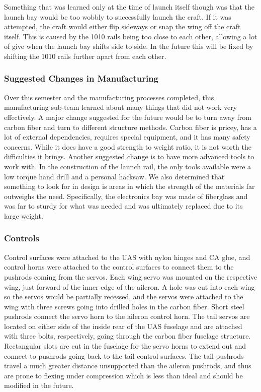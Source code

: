 \documentclass{article}
\begin{document}
Something that was learned only at the time of launch itself though was that the launch bay would be too wobbly to successfully launch the craft. If it was attempted, the craft would either flip sideways or snap the wing off the craft itself. This is caused by the 1010 rails being too close to each other, allowing a lot of give when the launch bay shifts side to side. In the future this will be fixed by shifting the 1010 rails further apart from each other.

\subsubsection{Suggested Changes in Manufacturing}
Over this semester and the manufacturing processes completed, this manufacturing sub-team learned about many things that did not work very effectively. A major change suggested for the future would be to turn away from carbon fiber and turn to different structure methods. Carbon fiber is pricey, has a lot of external dependencies, requires special equipment, and it has many safety concerns. While it does have a good strength to weight ratio, it is not worth the difficulties it brings. Another suggested change is to have more advanced tools to work with. In the construction of the launch rail, the only tools available were a low torque hand drill and a personal hacksaw. We also determined that something to look for in design is areas in which the strength of the materials far outweighs the need. Specifically, the electronics bay was made of fiberglass and was far to sturdy for what was needed and was ultimately replaced due to its large weight.




\subsubsection{Controls}
Control surfaces were attached to the UAS with nylon hinges and CA glue, and control horns were attached to the control surfaces to connect them to the pushrods coming from the servos. Each wing servo was mounted on the respective wing, just forward of the inner edge of the aileron. A hole was cut into each wing so the servos would be partially recessed, and the servos were attached to the wing with three screws going into drilled holes in the carbon fiber. Short steel pushrods connect the servo horn to the aileron control horn. The tail servos are located on either side of the inside rear of the UAS fuselage and are attached with three bolts, respectively, going through the carbon fiber fuselage structure. Rectangular slots are cut in the fuselage for the servo horns to extend out and connect to pushrods going back to the tail control surfaces. The tail pushrods travel a much greater distance unsupported than the aileron pushrods, and thus are prone to flexing under compression which is less than ideal and should be modified in the future.
\end{document}

